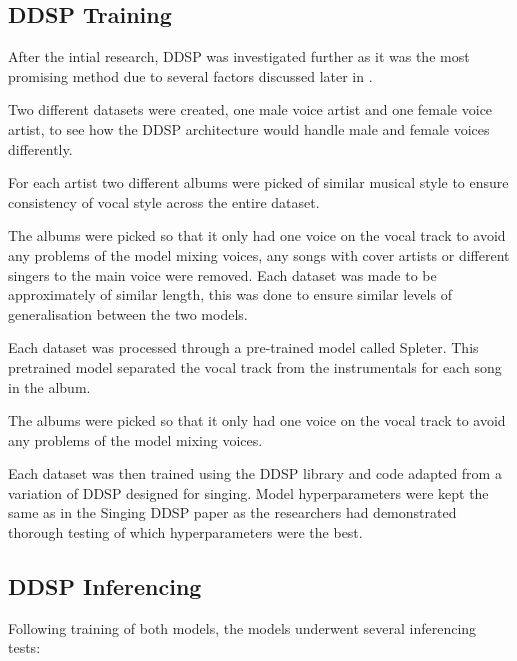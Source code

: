 \subsection{DDSP Training}

After the intial research, DDSP was investigated further as it was the most promising method due to several factors discussed later in .

Two different datasets were created, one male voice artist and one female voice artist, to see how the DDSP architecture would handle male and female voices differently.

For each artist two different albums were picked of similar musical style to ensure consistency of vocal style across the entire dataset.

The albums were picked so that it only had one voice on the vocal track to avoid any problems of the model mixing voices, any songs with cover artists or different singers to the main voice were removed. Each dataset was made to be approximately of similar length, this was done to ensure similar levels of generalisation between the two models.

Each dataset was processed through a pre-trained model called Spleter\cite{Spleeter}. This pretrained model separated the vocal track from the instrumentals for each song in the album.

The albums were picked so that it only had one voice on the vocal track to avoid any problems of the model mixing voices.

Each dataset was then trained using the DDSP library\cite{DDSPPip} and code adapted from a variation of DDSP designed for singing\cite{SingingDDSP}. Model hyperparameters were kept the same as in the Singing DDSP paper\cite{SingingDDSP} as the researchers had demonstrated thorough testing of which hyperparameters were the best.

\subsection{DDSP Inferencing}

Following training of both models, the models underwent several inferencing tests:

